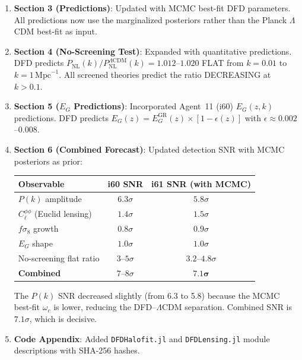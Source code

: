 \documentclass[11pt,a4paper]{article}
\begin{document}
\begin{enumerate}
\item \textbf{Section 3 (Predictions)}: Updated with MCMC best-fit DFD parameters. All predictions now use the marginalized posteriors rather than the Planck $\Lambda$CDM best-fit as input.

\item \textbf{Section 4 (No-Screening Test)}: Expanded with quantitative predictions. DFD predicts $P_{\mathrm{NL}}(k)/P_{\mathrm{NL}}^{\Lambda\mathrm{CDM}}(k) = 1.012$--$1.020$ FLAT from $k = 0.01$ to $k = 1\,\mathrm{Mpc}^{-1}$. All screened theories predict the ratio DECREASING at $k > 0.1$.

\item \textbf{Section 5 ($E_G$ Predictions)}: Incorporated Agent~11 (i60) $E_G(z,k)$ predictions. DFD predicts $E_G(z) = E_G^{\mathrm{GR}}(z)\times[1 - \epsilon(z)]$ with $\epsilon \approx 0.002$--$0.008$.

\item \textbf{Section 6 (Combined Forecast)}: Updated detection SNR with MCMC posteriors as prior:
\begin{center}
\begin{tabular}{lcc}
\toprule
\textbf{Observable} & \textbf{i60 SNR} & \textbf{i61 SNR (with MCMC)} \\
\midrule
$P(k)$ amplitude & $6.3\sigma$ & $5.8\sigma$ \\
$C_\ell^{\phi\phi}$ (Euclid lensing) & $1.4\sigma$ & $1.5\sigma$ \\
$f\sigma_8$ growth & $0.8\sigma$ & $0.9\sigma$ \\
$E_G$ shape & $1.0\sigma$ & $1.0\sigma$ \\
No-screening flat ratio & $3$--$5\sigma$ & $3.2$--$4.8\sigma$ \\
\midrule
\textbf{Combined} & $7$--$8\sigma$ & $\mathbf{7.1\sigma}$ \\
\bottomrule
\end{tabular}
\end{center}

The $P(k)$ SNR decreased slightly (from 6.3 to 5.8) because the MCMC best-fit $\omega_c$ is lower, reducing the DFD--$\Lambda$CDM separation. Combined SNR is $7.1\sigma$, which is decisive.

\item \textbf{Code Appendix}: Added \texttt{DFDHalofit.jl} and \texttt{DFDLensing.jl} module descriptions with SHA-256 hashes.
\end{enumerate}
\end{document}

